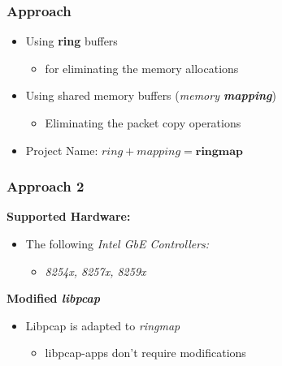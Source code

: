 \begin{frame}
\frametitle{Approach}
\begin{itemize}
	\item<1-> Using \textbf{ring} buffers
		\begin{itemize}
			\item<1-> for eliminating the memory allocations
		\end{itemize}

	\item<2-> Using shared memory buffers (\emph{memory \textbf{mapping}})
		\begin{itemize}
			\item<2-> Eliminating the packet copy operations				
		\end{itemize}
	\item<3->[$\Rightarrow$] Project Name: $ring + mapping = \textbf{ringmap}$
\end{itemize}
\end{frame}


\begin{frame}
\frametitle{Approach 2}
\textbf{Supported Hardware:}
\begin{itemize}
	\item The following \emph{Intel GbE Controllers:}
		\begin{itemize}
			\item \small{\emph{8254x, 8257x, 8259x}}\newline
		\end{itemize}
\end{itemize}

\textbf{Modified \emph{libpcap}}
\begin{itemize}
	\item Libpcap is adapted to \emph{ringmap}
	\begin{itemize}
		\item libpcap-apps don't require modifications\newline
	\end{itemize}
\end{itemize}
\end{frame}

